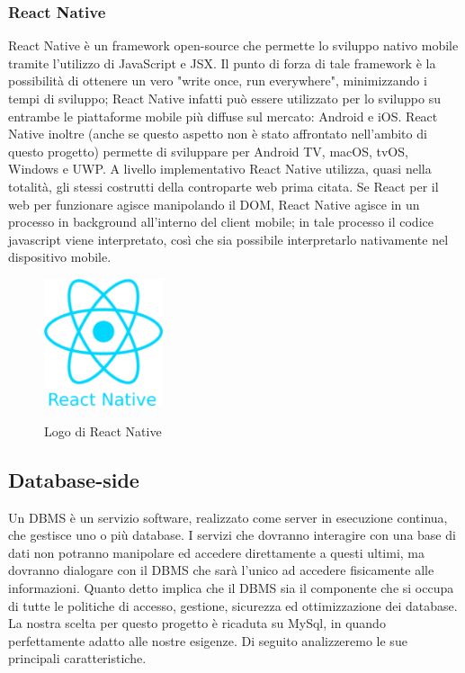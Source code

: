 \subsubsection{React Native}
React Native è un framework open-source che permette lo sviluppo nativo mobile tramite l'utilizzo di JavaScript e JSX.\newline
Il punto di forza di tale framework è la possibilità di ottenere un vero "write once, run everywhere", minimizzando i tempi di sviluppo; React Native infatti può essere utilizzato per lo sviluppo su entrambe le piattaforme mobile più diffuse sul mercato: Android e iOS.\newline
React Native inoltre (anche se questo aspetto non è stato affrontato nell'ambito di questo progetto) permette di sviluppare per Android TV, macOS, tvOS, Windows e UWP.\newline
A livello implementativo React Native utilizza, quasi nella totalità, gli stessi costrutti della controparte web prima citata.\newline
Se React per il web per funzionare agisce manipolando il DOM, React Native agisce in un processo in background all'interno del client mobile; in tale processo il codice javascript viene interpretato, così che sia possibile interpretarlo nativamente nel dispositivo mobile.
\begin{figure}[H]
    \caption{Logo di React Native ~\cite{ReactNat38:online}}
    \centering
    \includegraphics[width=35mm]{img/logos/react_native_logo.png}
    \label{fig:react_native_logo}
\end{figure}

\subsection{Database-side}
Un DBMS è un servizio software, realizzato come server in esecuzione continua, che gestisce uno o più database. I servizi che dovranno interagire con una base di dati non potranno manipolare ed accedere direttamente a questi ultimi, ma dovranno dialogare con il DBMS che sarà l'unico ad accedere fisicamente alle informazioni. Quanto detto implica che il DBMS sia il componente che si occupa di tutte le politiche di accesso, gestione, sicurezza ed ottimizzazione dei database. La nostra scelta per questo progetto è ricaduta su MySql, in quando perfettamente adatto alle nostre esigenze. Di seguito analizzeremo le sue principali caratteristiche.
\label{sub:db-tech}
